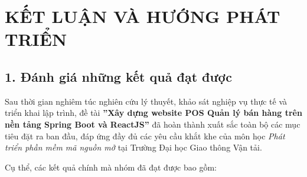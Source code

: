 \cleardoublepage
\chapter*{KẾT LUẬN VÀ HƯỚNG PHÁT TRIỂN}
\label{sec:ket_luan}

\section*{1. Đánh giá những kết quả đạt được}
\label{sec:ket_qua_dat_duoc}

Sau thời gian nghiêm túc nghiên cứu lý thuyết, khảo sát nghiệp vụ thực tế và triển khai lập trình, đề tài \textbf{''Xây dựng website POS Quản lý bán hàng trên nền tảng Spring Boot và ReactJS''} đã hoàn thành xuất sắc toàn bộ các mục tiêu đặt ra ban đầu, đáp ứng đầy đủ các yêu cầu khắt khe của môn học \textit{Phát triển phần mềm mã nguồn mở} tại Trường Đại học Giao thông Vận tải.

Cụ thể, các kết quả chính mà nhóm đã đạt được bao gồm:

